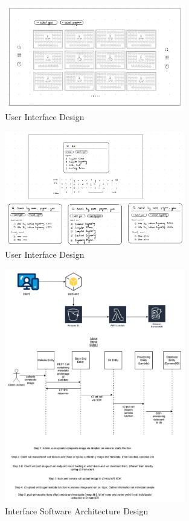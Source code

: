 \documentclass[12pt, titlepage]{article}
\begin{document}
\begin{figure}[H]
\centering
\includegraphics[width=0.7\textwidth]{IMG_0070.png}
\caption{User Interface Design}
\label{FigUH}
\end{figure}

\begin{figure}[H]
\centering
\includegraphics[width=0.7\textwidth]{IMG_0071.png}
\caption{User Interface Design}
\label{FigUH}
\end{figure}

\begin{figure}[H]
\centering
\includegraphics[width=0.7\textwidth]{ocr-arch_1.png}
\caption{Interface Software Architecture Design}
\label{FigUH}
\end{figure}
\end{document}
